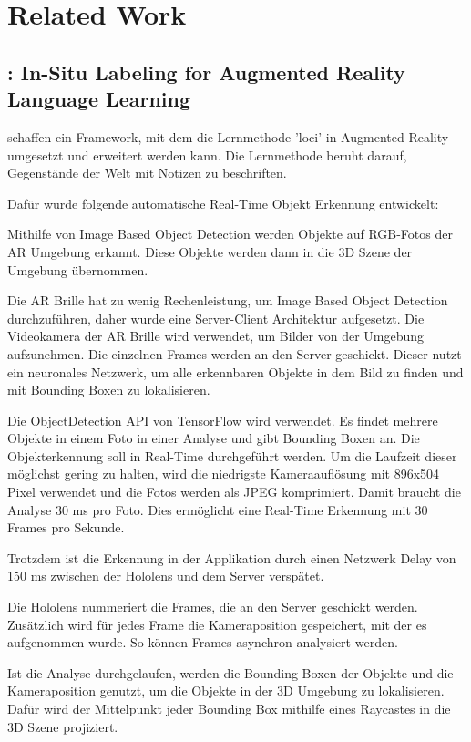 \section{Related Work}

\subsection{\cite{LabelingLanguageLearning}: In-Situ Labeling for Augmented Reality Language Learning}
\cite{LabelingLanguageLearning} schaffen ein Framework, mit dem die Lernmethode 'loci' in Augmented Reality umgesetzt und erweitert werden kann. Die Lernmethode beruht darauf, Gegenstände der Welt mit Notizen zu beschriften. 

Dafür wurde folgende automatische Real-Time Objekt Erkennung entwickelt:

Mithilfe von Image Based Object Detection werden Objekte auf RGB-Fotos der AR Umgebung erkannt. Diese Objekte werden dann in die 3D Szene der Umgebung übernommen. 

Die AR Brille hat zu wenig Rechenleistung, um Image Based Object Detection durchzuführen, daher wurde eine Server-Client Architektur aufgesetzt. Die Videokamera der AR Brille wird verwendet, um Bilder von der Umgebung aufzunehmen. Die einzelnen Frames werden an den Server geschickt. Dieser nutzt ein neuronales Netzwerk, um alle erkennbaren Objekte in dem Bild zu finden und mit Bounding Boxen zu lokalisieren.

Die ObjectDetection API von TensorFlow wird verwendet. Es findet mehrere Objekte in einem Foto in einer Analyse und gibt Bounding Boxen an. Die Objekterkennung soll in Real-Time durchgeführt werden. Um die Laufzeit dieser möglichst gering zu halten, wird die niedrigste Kameraauflösung mit 896x504 Pixel verwendet und die Fotos werden als JPEG komprimiert. Damit braucht die Analyse 30 ms pro Foto. Dies ermöglicht eine Real-Time Erkennung mit 30 Frames pro Sekunde. 

Trotzdem ist die Erkennung in der Applikation durch einen Netzwerk Delay von 150 ms zwischen der Hololens und dem Server verspätet.

Die Hololens nummeriert die Frames, die an den Server geschickt werden. Zusätzlich wird für jedes Frame die Kameraposition gespeichert, mit der es aufgenommen wurde. So können Frames asynchron analysiert werden. 

Ist die Analyse durchgelaufen, werden die Bounding Boxen der Objekte und die Kameraposition genutzt, um die Objekte in der 3D Umgebung zu lokalisieren. Dafür wird der Mittelpunkt jeder Bounding Box mithilfe eines Raycastes in die 3D Szene projiziert.

